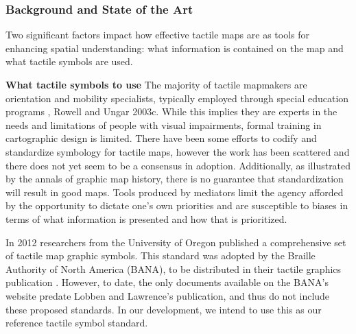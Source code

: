 
\subsubsection{Background and State of the Art}

Two significant factors impact how effective tactile maps are as tools for enhancing spatial understanding: what information is contained on the map and what tactile symbols are used. 

\textbf{What tactile symbols to use}
The majority of tactile mapmakers are orientation and mobility specialists, typically employed through special education programs
\cite{lobben2012tactile}, \ac{Rowell and Ungar 2003c}. While this implies they are experts in the needs and limitations of people with visual impairments, formal training in cartographic design is limited. There have been some efforts to codify and standardize symbology for tactile maps, however the work has been scattered and there does not yet seem to be a consensus in adoption. Additionally, as illustrated by the annals of graphic map history, there is no guarantee that standardization will result in good maps. Tools produced by mediators limit the agency afforded by the opportunity to dictate one’s own priorities and are susceptible to biases in terms of what information is presented and how that is prioritized. 

In 2012 researchers from the University of Oregon published a comprehensive set of tactile map graphic symbols.  This standard was adopted by the Braille Authority of North America (BANA), to be distributed in their tactile graphics publication
\cite{lobben2012tactile}. However, to date, the only documents available on the BANA’s website predate Lobben and Lawrence’s publication, and thus do not include these proposed standards. In our development, we intend to use this as our reference tactile symbol standard.

